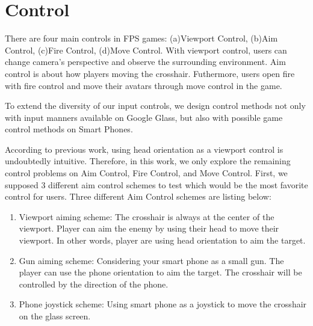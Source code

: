 \documentclass{sig-alternate}
\begin{document}
\section{Control}
There are four main controls in FPS games: (a)Viewport Control, (b)Aim Control, (c)Fire Control, (d)Move Control.
With viewport control, users can change camera's perspective and observe the surrounding environment.
Aim control is about how players moving the crosshair.
Futhermore, users open fire with fire control and move their avatars through move control in the game.

To extend the diversity of our input controls, we design control methods not only with input manners available on Google Glass, but also with possible game control methods on Smart Phones.

According to previous work\cite{headvideo,tele,robot,viewport}, using head orientation as a viewport control is undoubtedly intuitive.%
Therefore, in this work, we only explore the remaining control problems on Aim Control, Fire Control, and Move Control. 
First, we supposed 3 different aim control schemes to test which would be the most favorite control for users. 
Three different Aim Control schemes are listing below:

\begin{enumerate}
\item Viewport aiming scheme: The crosshair is always at the center of the viewport. Player can aim the enemy by using their head to move their viewport. In other words, player are using head orientation to aim the target.

\item Gun aiming scheme: Considering your smart phone as a small gun. The player can use the phone orientation to aim the target. The crosshair will be controlled by the direction of the phone.

\item Phone joystick scheme: Using smart phone as a joystick to move the crosshair on the glass screen.
\end{enumerate}
\end{document}
